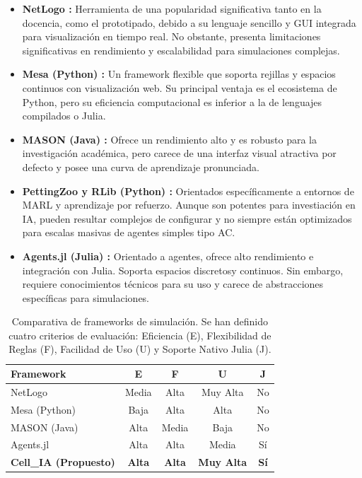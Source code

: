 \documentclass[runningheads]{llncs}
\begin{document}
\begin{itemize}
    \item \textbf{NetLogo \cite{ref_netlogo}:} Herramienta de una popularidad significativa tanto en la docencia, como el prototipado, debido a su lenguaje sencillo y GUI integrada para visualización en tiempo real. No obstante, presenta limitaciones significativas en rendimiento y escalabilidad para simulaciones complejas.
    \item \textbf{Mesa (Python) \cite{ref_mesa}:} Un framework flexible que soporta rejillas y espacios continuos con visualización web. Su principal ventaja es el ecosistema de Python, pero su eficiencia computacional es inferior a la de lenguajes compilados o Julia.
    \item \textbf{MASON (Java) \cite{ref_mason}:} Ofrece un rendimiento alto y es robusto para la investigación académica, pero carece de una interfaz visual atractiva por defecto y posee una curva de aprendizaje pronunciada.
    \item \textbf{PettingZoo \cite{ref_pettingzoo} y RLib (Python) \cite{ref_rlib}:} Orientados específicamente a entornos de MARL y aprendizaje por refuerzo. Aunque son potentes para investiación en IA, pueden resultar complejos de configurar y no siempre están optimizados para escalas masivas de agentes simples tipo AC.
    \item  \textbf{Agents.jl (Julia) \cite{ref_agentsjl}:} Orientado a agentes, ofrece alto rendimiento e integración con Julia. Soporta espacios discretosy continuos. Sin embargo, requiere conocimientos técnicos para su uso y carece de abstracciones específicas para simulaciones.
\end{itemize}

\begin{table}[h]
\centering
\caption{Comparativa de frameworks de simulación. Se han definido cuatro criterios de evaluación: Eficiencia (E), Flexibilidad de Reglas (F), Facilidad de Uso (U) y Soporte Nativo Julia (J). }
\label{tab:comparativa_frameworks}
\begin{tabular}{@{}lcccc@{}}
\toprule
\textbf{Framework} & \textbf{E} & \textbf{F} & \textbf{U} & \textbf{J} \\ \midrule
NetLogo \cite{ref_netlogo} & Media & Alta & Muy Alta & No \\
Mesa (Python) \cite{ref_mesa} & Baja & Alta & Alta & No \\
MASON (Java) \cite{ref_mason} & Alta & Media & Baja & No \\
Agents.jl \cite{ref_agentsjl} & Alta & Alta & Media & Sí \\
\textbf{Cell\_IA (Propuesto)} & \textbf{Alta} & \textbf{Alta} & \textbf{Muy Alta} & \textbf{Sí} \\ \bottomrule
\end{tabular}
\end{table}
\end{document}
